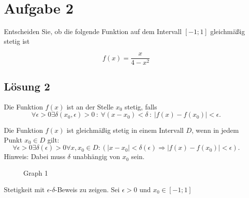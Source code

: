 \documentclass[main.tex]{subfiles}
\begin{document}
\section{Aufgabe 2}
Entscheiden Sie, ob die folgende Funktion auf dem Intervall $[-1;1]$ gleichmäßig stetig ist

\begin{equation*}
    f(x) =\frac{x}{4-x^{2}}
\end{equation*}

\subsection{Lösung 2}

\textcolor[rgb]{0.4,0.72,0.06}{Die Funktion }\textcolor[rgb]{0.4,0.72,0.06}{$\displaystyle f( x)$}\textcolor[rgb]{0.4,0.72,0.06}{ ist an der Stelle }\textcolor[rgb]{0.4,0.72,0.06}{$\displaystyle x_{0}$}\textcolor[rgb]{0.4,0.72,0.06}{ stetig, falls}
\textcolor[rgb]{0.4,0.72,0.06}{\begin{equation*}
    \forall \epsilon  >0\exists \delta ( x_{0} ,\epsilon )  >0\ :\ \forall ( x-x_{0}) < \delta \ :\ | f( x) -f( x_{0})| < \epsilon \text{.}
\end{equation*}}

Die Funktion $f( x)$ ist gleichmäßig stetig in einem Intervall $D$, wenn in jedem Punkt $x_{0} \in D$ gilt:
\begin{equation*}
    \forall \epsilon  >0\exists \delta ( \epsilon )  >0\forall x,x_{0} \in D:(| x-x_{0}| < \delta ( \epsilon ) \Longrightarrow | f( x) -f( x_{0})| < \epsilon )\text{.}
\end{equation*}
Hinweis: Dabei muss $\delta $ unabhängig von $x_{0}$ sein.



\begin{figure}
    
    \caption{Graph 1}
\end{figure}

Stetigkeit mit $\epsilon $-$\delta $-Beweis zu zeigen. Sei $\epsilon  >0$ und $x_{0} \in [ -1;1]$
\end{document}
